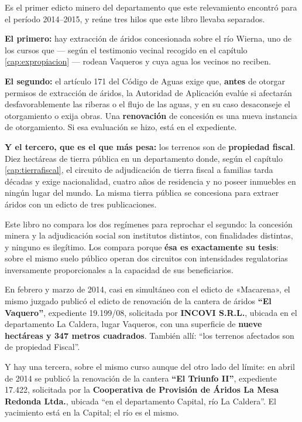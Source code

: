 \begin{cautela}
Es el primer edicto minero del departamento que este relevamiento encontró para el período 2014--2015, y reúne tres hilos que este libro llevaba separados.

\textbf{El primero:} hay extracción de áridos concesionada sobre el río Wierna, uno de los cursos que --- según el testimonio vecinal recogido en el capítulo \ref{cap:expropiacion} --- rodean Vaqueros y cuya agua los vecinos no reciben.

\textbf{El segundo:} el artículo 171 del Código de Aguas exige que, \textbf{antes} de otorgar permisos de extracción de áridos, la Autoridad de Aplicación evalúe si afectarán desfavorablemente las riberas o el flujo de las aguas, y en su caso desaconseje el otorgamiento o exija obras. Una \textbf{renovación} de concesión es una nueva instancia de otorgamiento. Si esa evaluación se hizo, está en el expediente.

\textbf{Y el tercero, que es el que más pesa:} los terrenos son de \textbf{propiedad fiscal}. Diez hectáreas de tierra pública en un departamento donde, según el capítulo \ref{cap:tierrafiscal}, el circuito de adjudicación de tierra fiscal a familias tarda décadas y exige nacionalidad, cuatro años de residencia y no poseer inmuebles en ningún lugar del mundo. La misma tierra pública se concesiona para extraer áridos con un edicto de tres publicaciones.

Este libro no compara los dos regímenes para reprochar el segundo: la concesión minera y la adjudicación social son institutos distintos, con finalidades distintas, y ninguno es ilegítimo. Los compara porque \textbf{ésa es exactamente su tesis}: sobre el mismo suelo público operan dos circuitos con intensidades regulatorias inversamente proporcionales a la capacidad de sus beneficiarios.
\end{cautela}

En febrero y marzo de 2014, casi en simultáneo con el edicto de «Macarena», el mismo juzgado publicó el edicto de renovación de la cantera de áridos \textbf{``El Vaquero''}, expediente 19.199/08, solicitada por \textbf{INCOVI S.R.L.}, ubicada en el departamento La Caldera, lugar Vaqueros, con una superficie de \textbf{nueve hectáreas y 347 metros cuadrados}. También allí: ``los terrenos afectados son de propiedad Fiscal''.

Y hay una tercera, sobre el mismo curso aunque del otro lado del límite: en abril de 2014 se publicó la renovación de la cantera \textbf{``El Triunfo II''}, expediente 17.422, solicitada por la \textbf{Cooperativa de Provisión de Áridos La Mesa Redonda Ltda.}, ubicada ``en el departamento Capital, río La Caldera''. El yacimiento está en la Capital; el río es el mismo.

